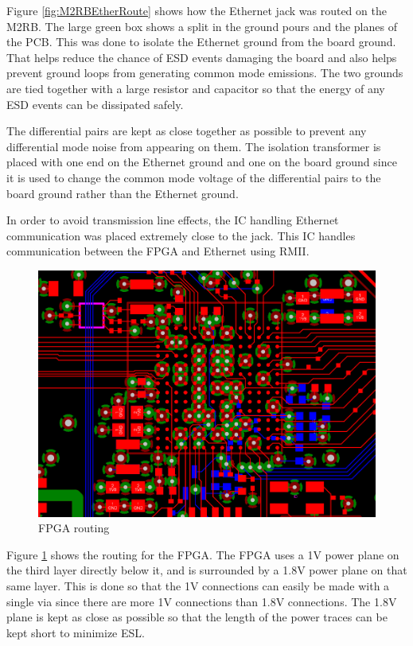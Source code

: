 \documentclass[crop=false]{standalone}
\begin{document}
        Figure \ref{fig:M2RBEtherRoute} shows how the Ethernet jack was routed on the M2RB. The large green box shows a split in the ground pours and the planes of the PCB. This was done to isolate the Ethernet ground from the board ground. That helps reduce the chance of ESD events damaging the board and also helps prevent ground loops from generating common mode emissions. The two grounds are tied together with a large resistor and capacitor so that the energy of any ESD events can be dissipated safely.
        
        The differential pairs are kept as close together as possible to prevent any differential mode noise from appearing on them. The isolation transformer is placed with one end on the Ethernet ground and one on the board ground since it is used to change the common mode voltage of the differential pairs to the board ground rather than the Ethernet ground.
        
        In order to avoid transmission line effects, the IC handling Ethernet communication was placed extremely close to the jack. This IC handles communication between the FPGA and Ethernet using RMII.
        
        \pagebreak
        
        \begin{figure}[H]
            \centering
            \includegraphics[width=\textwidth]{M2RBFPGARoute.PNG}
            \caption{FPGA routing}
            \label{fig:M2RBFPGARoute}
        \end{figure}
        
        Figure \ref{fig:M2RBFPGARoute} shows the routing for the FPGA. The FPGA uses a 1V power plane on the third layer directly below it, and is surrounded by a 1.8V power plane on that same layer. This is done so that the 1V connections can easily be made with a single via since there are more 1V connections than 1.8V connections. The 1.8V plane is kept as close as possible so that the length of the power traces can be kept short to minimize ESL.
        
\end{document}
